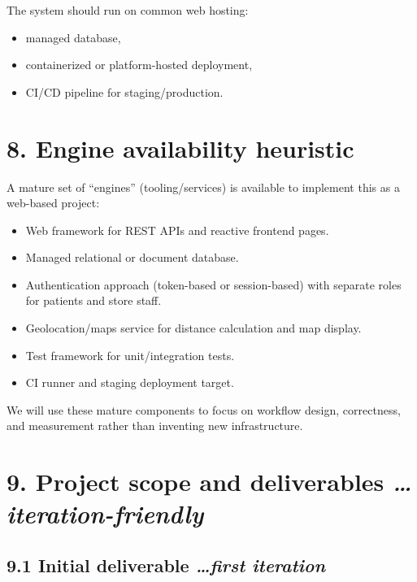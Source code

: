 \documentclass[
]{article}
\begin{document}
The system should run on common web hosting:

\begin{itemize}
\item
  managed database,
\item
  containerized or platform-hosted deployment,
\item
  CI/CD pipeline for staging/production.
\end{itemize}

\section{\texorpdfstring{\textbf{8. Engine availability
heuristic}}{8. Engine availability heuristic}}\label{engine-availability-heuristic}

A mature set of ``engines'' (tooling/services) is available to implement
this as a web-based project:

\begin{itemize}
\item
  Web framework for REST APIs and reactive frontend pages.
\item
  Managed relational or document database.
\item
  Authentication approach (token-based or session-based) with separate
  roles for patients and store staff.
\item
  Geolocation/maps service for distance calculation and map display.
\item
  Test framework for unit/integration tests.
\item
  CI runner and staging deployment target.
\end{itemize}

We will use these mature components to focus on workflow design,
correctness, and measurement rather than inventing new infrastructure.

\section{\texorpdfstring{\textbf{9. Project scope and deliverables}
\emph{\ldots iteration-friendly}}{9. Project scope and deliverables \ldots iteration-friendly}}\label{project-scope-and-deliverables-iteration-friendly}

\subsection{\texorpdfstring{\textbf{9.1 Initial deliverable}
\emph{\ldots first iteration}
}{9.1 Initial deliverable \ldots first iteration }}\label{initial-deliverable-first-iteration}
\end{document}
